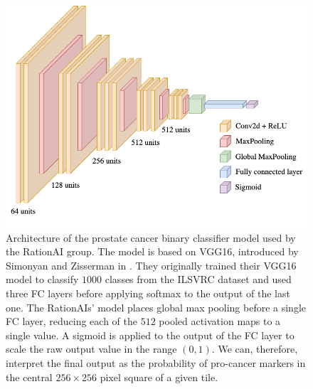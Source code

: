 \begin{figure}
    \begin{center}
    \begin{minipage}{0.75\textwidth}
      \includegraphics[width=\textwidth]{img/nn-arch.png}
    \end{minipage}
    \caption{Architecture of the prostate cancer binary classifier model used by the RationAI group. The model is based on VGG16, introduced by Simonyan and Zisserman in \cite{vgg16}. They originally trained their VGG16 model to classify $1000$ classes from the ILSVRC dataset \cite{ilsvrc} and used three FC layers before applying softmax to the output of the last one. The RationAIs' model places global max pooling before a single FC layer, reducing each of the $512$ pooled activation maps to a single value. A sigmoid is applied to the output of the FC layer to scale the raw output value in the range $(0, 1)$. We can, therefore, interpret the final output as the probability of pro-cancer markers in the central $256 \times 256$ pixel square of a given tile.}
    \label{fig:rationai-vgg16}
    \end{center}
\end{figure}

